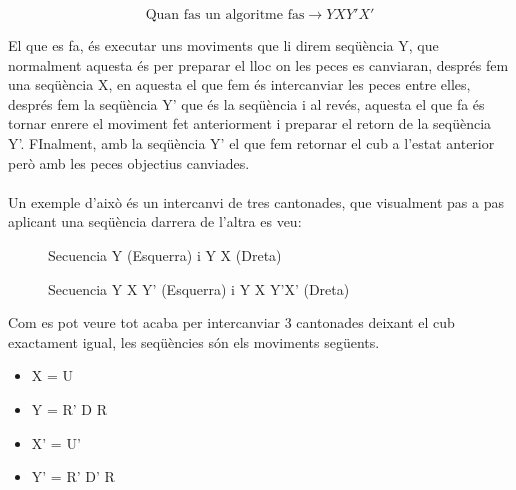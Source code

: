 $$ \textrm{Quan fas un algoritme fas} \rightarrow Y X Y' X' $$

El que es fa, és executar uns moviments que li direm seqüència Y, que normalment aquesta és per preparar el lloc on les peces es canviaran, després fem una seqüència X, en aquesta el que fem és intercanviar les peces entre elles, després fem la seqüència  Y' que és la seqüència i al revés, aquesta el que fa és tornar enrere el moviment fet anteriorment i preparar el retorn de la seqüència  Y'. FInalment, amb la seqüència  Y' el que fem retornar el cub a l'estat anterior però amb les peces objectius canviades.
\\\\Un exemple d'això és un intercanvi de tres cantonades, que visualment pas a pas aplicant una seqüència darrera de l'altra es veu:

\begin{figure}[htbp]
    \centering
    \begin{subfigure}
        \centering\RubikCubeSolvedWY
    \end{subfigure}
    \begin{subfigure}
        \centering\RubikCubeSolvedWY
    \end{subfigure}
    \caption{Secuencia Y (Esquerra) i Y X (Dreta)}
\end{figure}

\begin{figure}[htbp]
    \centering
    \begin{subfigure}
        \centering\RubikCubeSolvedWY
    \end{subfigure}
    \begin{subfigure}
        \centering\RubikCubeSolvedWY
    \end{subfigure}
    \caption{Secuencia Y X Y' (Esquerra) i Y X Y'X' (Dreta)}
\end{figure}

Com es pot veure tot acaba per intercanviar 3 cantonades deixant el cub exactament igual, les seqüències són els moviments següents.
\begin{itemize}
    \item X = U
    \item Y = R' D R
    \item X' = U'
    \item Y' = R' D' R
\end{itemize}

